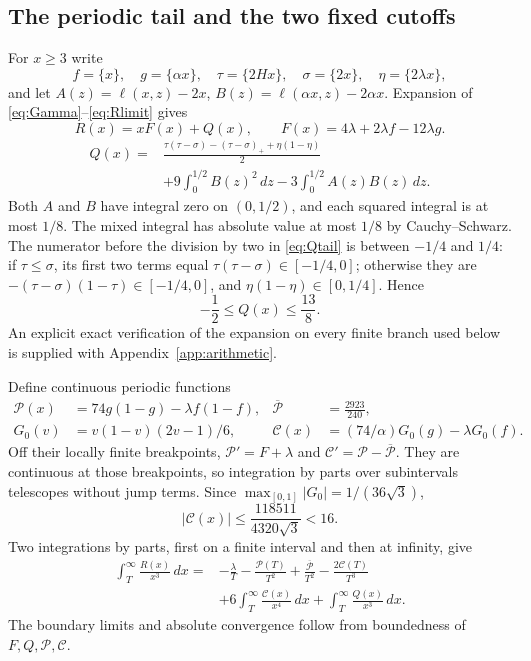 \subsection{The periodic tail and the two fixed cutoffs}
For $x\ge3$ write
\[
 f=\{x\},\quad g=\{\alpha x\},\quad \tau=\{2Hx\},\quad
 \sigma=\{2x\},\quad\eta=\{2\lambda x\},
\]
and let $A(z)=\ell(x,z)-2x$, $B(z)=\ell(\alpha x,z)-2\alpha x$.
Expansion of \eqref{eq:Gamma}--\eqref{eq:Rlimit} gives
\begin{equation}\label{eq:RFQ}
 R(x)=xF(x)+Q(x),\qquad F(x)=4\lambda+2\lambda f-12\lambda g.
\end{equation}
\begin{equation}\label{eq:Qtail}
\begin{split}
 Q(x)={}&\frac{\tau(\tau-\sigma)-(\tau-\sigma)_++\eta(1-\eta)}2\\
 &+9\int_0^{1/2}B(z)^2\,dz-3\int_0^{1/2}A(z)B(z)\,dz.
\end{split}
\end{equation}
Both $A$ and $B$ have integral zero on $(0,1/2)$, and each squared
integral is at most $1/8$. The mixed integral has absolute value at most
$1/8$ by Cauchy--Schwarz. The numerator before the division by two in
\eqref{eq:Qtail} is between $-1/4$ and $1/4$: if $\tau\le\sigma$, its
first two terms equal $\tau(\tau-\sigma)\in[-1/4,0]$; otherwise they
are $-(\tau-\sigma)(1-\tau)\in[-1/4,0]$, and
$\eta(1-\eta)\in[0,1/4]$. Hence
\begin{equation}\label{eq:Qtailbounds}
 -\frac12\le Q(x)\le\frac{13}{8}.
\end{equation}
An explicit exact verification of the expansion on every finite branch
used below is supplied with Appendix~\ref{app:arithmetic}.

Define continuous periodic functions
\begin{align*}
 \mathcal P(x)&=74g(1-g)-\lambda f(1-f),&
 \overline{\mathcal P}&=\frac{2923}{240},\\
 G_0(v)&=v(1-v)(2v-1)/6,&
 \mathcal C(x)&=(74/\alpha)G_0(g)-\lambda G_0(f).
\end{align*}
Off their locally finite breakpoints,
$\mathcal P'=F+\lambda$ and
$\mathcal C'=\mathcal P-\overline{\mathcal P}$. They are continuous at
those breakpoints, so integration by parts over subintervals telescopes
without jump terms. Since
$\max_{[0,1]}|G_0|=1/(36\sqrt3)$,
\[
 |\mathcal C(x)|\le\frac{118511}{4320\sqrt3}<16.
\]
Two integrations by parts, first on a finite interval and then at
infinity, give
\begin{equation}\label{eq:tailidentity}
\begin{split}
 \int_T^\infty\frac{R(x)}{x^3}\,dx={}&-\frac\lambda T
 -\frac{\mathcal P(T)}{T^2}+\frac{\overline{\mathcal P}}{T^2}
 -\frac{2\mathcal C(T)}{T^3}\\
 &+6\int_T^\infty\frac{\mathcal C(x)}{x^4}\,dx
 +\int_T^\infty\frac{Q(x)}{x^3}\,dx.
\end{split}
\end{equation}
The boundary limits and absolute convergence follow from boundedness of
$F,Q,\mathcal P,\mathcal C$.

